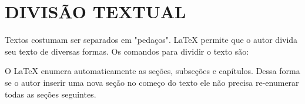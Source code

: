 
\chapter{DIVISÃO TEXTUAL}

Textos costumam ser separados em "pedaços".
\LaTeX{} permite que o autor divida seu texto de diversas formas.
Os comandos para dividir o texto são:



O \LaTeX{} enumera automaticamente as seções, subseções e capítulos.
Dessa forma se o autor inserir uma nova seção no começo do texto ele não precisa re-enumerar todas as seções seguintes.